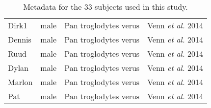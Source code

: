 \begin{table}[h]
\begin{tabular}{|l|l|l|l|}
Dirk1  &  male  &  Pan troglodytes verus  & Venn \textit{et al.} 2014\cite{Venn1272}  \\
Dennis  &  male  &  Pan troglodytes verus  & Venn \textit{et al.} 2014\cite{Venn1272}  \\
Ruud  &  male  &  Pan troglodytes verus  & Venn \textit{et al.} 2014\cite{Venn1272}  \\
Dylan  &  male  &  Pan troglodytes verus  & Venn \textit{et al.} 2014\cite{Venn1272}  \\
Marlon  &  male  &  Pan troglodytes verus  & Venn \textit{et al.} 2014\cite{Venn1272}  \\
Pat  &  male  &  Pan troglodytes verus  & Venn \textit{et al.} 2014\cite{Venn1272} \\
\hline

\end{tabular}
\caption{\label{tab:subjects}Metadata for the 33 subjects used in this study.}
\end{table}


